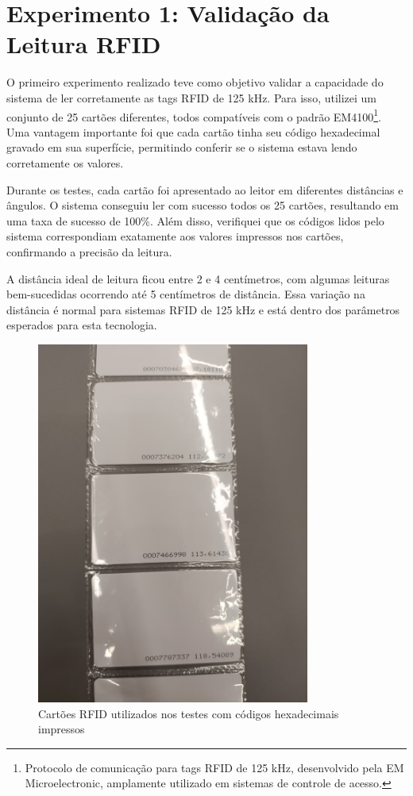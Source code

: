 \section{Experimento 1: Validação da Leitura RFID}

O primeiro experimento realizado teve como objetivo validar a capacidade do sistema de ler corretamente as tags RFID de 125 kHz. Para isso, utilizei um conjunto de 25 cartões diferentes, todos compatíveis com o padrão EM4100\footnote{Protocolo de comunicação para tags RFID de 125 kHz, desenvolvido pela EM Microelectronic, amplamente utilizado em sistemas de controle de acesso.}. Uma vantagem importante foi que cada cartão tinha seu código hexadecimal gravado em sua superfície, permitindo conferir se o sistema estava lendo corretamente os valores.

Durante os testes, cada cartão foi apresentado ao leitor em diferentes distâncias e ângulos. O sistema conseguiu ler com sucesso todos os 25 cartões, resultando em uma taxa de sucesso de 100\%. Além disso, verifiquei que os códigos lidos pelo sistema correspondiam exatamente aos valores impressos nos cartões, confirmando a precisão da leitura.

A distância ideal de leitura ficou entre 2 e 4 centímetros, com algumas leituras bem-sucedidas ocorrendo até 5 centímetros de distância. Essa variação na distância é normal para sistemas RFID de 125 kHz e está dentro dos parâmetros esperados para esta tecnologia.

\begin{figure}[htbp!]
\centering
\includegraphics[width=0.8\textwidth]{pre-textuais/figuras/cartoesRFID.JPG}
\caption{Cartões RFID utilizados nos testes com códigos hexadecimais impressos}
\label{fig:cartoes_rfid}
\end{figure}
